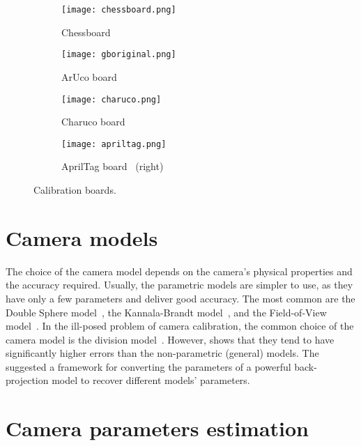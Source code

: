 \begin{figure}[h]
	\centering
	\begin{subfigure}[b]{0.45\textwidth}
		\centering
		\texttt{[image: chessboard.png]}
		\caption{Chessboard~\cite{OpenCVCameraCalibration}}
		\label{fig:chessboard}
	\end{subfigure}
	\hfill
	\begin{subfigure}[b]{0.45\textwidth}
		\centering
		\texttt{[image: gboriginal.png]}
		\caption{ArUco board~\cite{OpenCVDetectionArUco}}
		\label{fig:gboriginal}
	\end{subfigure}
	\begin{subfigure}[b]{0.45\textwidth}
		\centering
		\texttt{[image: charuco.png]}
		\caption{Charuco board~\cite{OpenCVDetectionChArUco}}
		\label{fig:charuco}
	\end{subfigure}
	\hfill
	\begin{subfigure}[b]{0.45\textwidth}
		\centering
		\texttt{[image: apriltag.png]}
		\caption{AprilTag board~\cite{rosebrockAprilTagPython2020} (right)}
		\label{fig:apriltag}
	\end{subfigure}
	\caption{Calibration boards.}
\end{figure}

\section{Camera models}\label{sub:camera_models}

The choice of the camera model depends on the camera's physical properties
and the accuracy required. Usually, the parametric models are simpler to use, as
they have only a few parameters and deliver good accuracy.
The most common are the Double Sphere
model~\citep{usenkoDoubleSphereCamera2018}, the Kannala-Brandt
model~\citep{kannalaGenericCameraModel2006}, and the Field-of-View
model~\citep{devernayStraightLinesHave2001}.
In the ill-posed problem of camera calibration, the common choice
of the camera model is the division
model~\citep{fitzgibbonSimultaneousLinearEstimation2001}.
However, \cite{schopsWhyHaving102020} shows that they tend to have
significantly higher errors than the non-parametric (general) models.
The \cite{lochmanBabelCalibUniversalApproach2021} suggested a framework for
converting the parameters of a powerful back-projection
\cite{zhangFlexibleNewTechnique2000} model to recover different models' parameters.

\section{Camera parameters estimation}\label{sub:camera_parameters_estimation}

